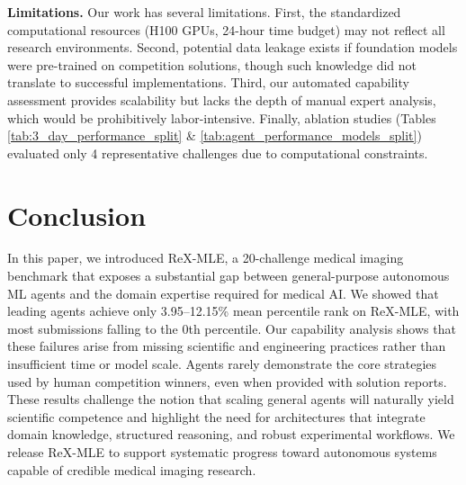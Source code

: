 \documentclass{midl} %
\begin{document}
\vspace{3pt} \noindent \textbf{Limitations.} Our work has several limitations. First, the standardized computational resources (H100 GPUs, 24-hour time budget) may not reflect all research environments. Second, potential data leakage exists if foundation models were pre-trained on competition solutions, though such knowledge did not translate to successful implementations. Third, our automated capability assessment provides scalability but lacks the depth of manual expert analysis, which would be prohibitively labor-intensive. Finally, ablation studies (Tables \ref{tab:3_day_performance_split} \& \ref{tab:agent_performance_models_split}) evaluated only 4 representative challenges due to computational constraints.


\section{Conclusion}

In this paper, we introduced ReX-MLE, a 20-challenge medical imaging benchmark that exposes a substantial gap between general-purpose autonomous ML agents and the domain expertise required for medical AI. We showed that leading agents achieve only 3.95–12.15\% mean percentile rank on ReX-MLE, with most submissions falling to the 0th percentile. Our capability analysis shows that these failures arise from missing scientific and engineering practices rather than insufficient time or model scale. Agents rarely demonstrate the core strategies used by human competition winners, even when provided with solution reports. These results challenge the notion that scaling general agents will naturally yield scientific competence and highlight the need for architectures that integrate domain knowledge, structured reasoning, and robust experimental workflows. We release ReX-MLE to support systematic progress toward autonomous systems capable of credible medical imaging research.
\end{document}
